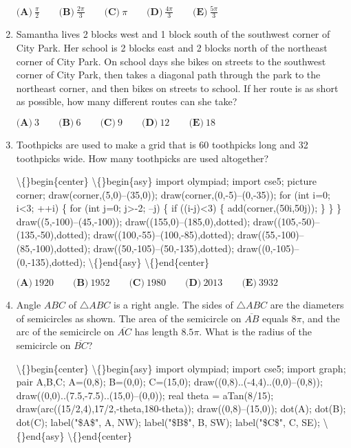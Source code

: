 \documentclass{article}
\begin{document}
\begin{enumerate}[label=\arabic*., itemsep=0.5em]
\(\textbf{(A)}\ \frac\pi2 \qquad \textbf{(B)}\ \frac{2\pi}3 \qquad \textbf{(C)}\ \pi \qquad \textbf{(D)}\ \frac{4\pi}3 \qquad \textbf{(E)}\ \frac{5\pi}3\)\par \vspace{0.5em}\item Samantha lives 2 blocks west and 1 block south of the southwest corner of City Park. Her school is 2 blocks east and 2 blocks north of the northeast corner of City Park. On school days she bikes on streets to the southwest corner of City Park, then takes a diagonal path through the park to the northeast corner, and then bikes on streets to school. If her route is as short as possible, how many different routes can she take?

\(\textbf{(A)}\ 3 \qquad \textbf{(B)}\ 6 \qquad \textbf{(C)}\ 9 \qquad \textbf{(D)}\ 12 \qquad \textbf{(E)}\ 18\)\par \vspace{0.5em}\item Toothpicks are used to make a grid that is 60 toothpicks long and 32 toothpicks wide. How many toothpicks are used altogether?


\textbackslash\{\}begin\{center\}
\textbackslash\{\}begin\{asy\}
import olympiad;
import cse5;
picture corner;
draw(corner,(5,0)--(35,0));
draw(corner,(0,-5)--(0,-35));
for (int i=0; i<3; ++i)
\{
for (int j=0; j>-2; --j)
\{
if ((i-j)<3)
\{
add(corner,(50i,50j));
\}
\}
\}
draw((5,-100)--(45,-100));
draw((155,0)--(185,0),dotted);
draw((105,-50)--(135,-50),dotted);
draw((100,-55)--(100,-85),dotted);
draw((55,-100)--(85,-100),dotted);
draw((50,-105)--(50,-135),dotted);
draw((0,-105)--(0,-135),dotted);
\textbackslash\{\}end\{asy\}
\textbackslash\{\}end\{center\}


\(\textbf{(A)}\ 1920 \qquad \textbf{(B)}\ 1952 \qquad \textbf{(C)}\ 1980 \qquad \textbf{(D)}\ 2013 \qquad \textbf{(E)}\ 3932\)\par \vspace{0.5em}\item Angle \(ABC\) of \(\triangle ABC\) is a right angle. The sides of \(\triangle ABC\) are the diameters of semicircles as shown. The area of the semicircle on \(\overline{AB}\) equals \(8\pi\), and the arc of the semicircle on \(\overline{AC}\) has length \(8.5\pi\). What is the radius of the semicircle on \(\overline{BC}\)?


\textbackslash\{\}begin\{center\}
\textbackslash\{\}begin\{asy\}
import olympiad;
import cse5;
import graph;
pair A,B,C;
A=(0,8);
B=(0,0);
C=(15,0);
draw((0,8)..(-4,4)..(0,0)--(0,8));
draw((0,0)..(7.5,-7.5)..(15,0)--(0,0));
real theta = aTan(8/15);
draw(arc((15/2,4),17/2,-theta,180-theta));
draw((0,8)--(15,0));
dot(A);
dot(B);
dot(C);
label("\$A\$", A, NW);
label("\$B\$", B, SW);
label("\$C\$", C, SE);
\textbackslash\{\}end\{asy\}
\textbackslash\{\}end\{center\}



\end{enumerate}
\end{document}
